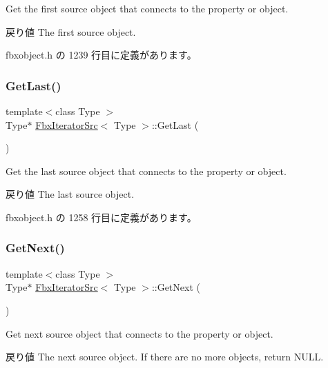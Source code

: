 Get the first source object that connects to the property or object. \begin{DoxyReturn}{戻り値}
The first source object. 
\end{DoxyReturn}


 fbxobject.\+h の 1239 行目に定義があります。

\mbox{\label{class_fbx_iterator_src_a44c9746ef3d04a0993781dfea8ac7142}} 
\subsubsection{\texorpdfstring{Get\+Last()}{GetLast()}}
{\footnotesize\ttfamily template$<$class Type $>$ \\
Type$\ast$ \hyperlink{class_fbx_iterator_src}{Fbx\+Iterator\+Src}$<$ Type $>$\+::Get\+Last (\begin{DoxyParamCaption}{ }\end{DoxyParamCaption})\hspace{0.3cm}{\ttfamily [inline]}}

Get the last source object that connects to the property or object. \begin{DoxyReturn}{戻り値}
The last source object. 
\end{DoxyReturn}


 fbxobject.\+h の 1258 行目に定義があります。

\mbox{\label{class_fbx_iterator_src_a04efb028369a31d5a822c3b2a7e23b16}} 
\subsubsection{\texorpdfstring{Get\+Next()}{GetNext()}}
{\footnotesize\ttfamily template$<$class Type $>$ \\
Type$\ast$ \hyperlink{class_fbx_iterator_src}{Fbx\+Iterator\+Src}$<$ Type $>$\+::Get\+Next (\begin{DoxyParamCaption}{ }\end{DoxyParamCaption})\hspace{0.3cm}{\ttfamily [inline]}}

Get next source object that connects to the property or object. \begin{DoxyReturn}{戻り値}
The next source object. If there are no more objects, return N\+U\+LL. 
\end{DoxyReturn}


